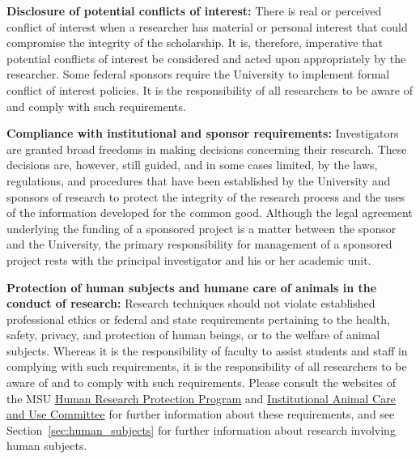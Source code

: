 \textbf{Disclosure of potential conflicts of interest:} There is real
or perceived conflict of interest when a researcher has material or
personal interest that could compromise the integrity of the
scholarship. It is, therefore, imperative that potential conflicts of
interest be considered and acted upon appropriately by the
researcher. Some federal sponsors require the University to implement
formal conflict of interest policies. It is the responsibility of all
researchers to be aware of and comply with such requirements. 

\textbf{Compliance with institutional and sponsor requirements:}
Investigators are granted broad freedoms in making decisions
concerning their research. These decisions are, however, still guided,
and in some cases limited, by the laws, regulations, and procedures
that have been established by the University and sponsors of research
to protect the integrity of the research process and the uses of the
information developed for the common good. Although the legal
agreement underlying the funding of a sponsored project is a matter
between the sponsor and the University, the primary responsibility for
management of a sponsored project rests with the principal
investigator and his or her academic unit. 

\textbf{Protection of human subjects and humane care of animals in the
  conduct of research:} Research techniques should not violate
established professional ethics or federal and state requirements
pertaining to the health, safety, privacy, and protection of human
beings, or to the welfare of animal subjects. Whereas it is the
responsibility of faculty to assist students and staff in complying
with such requirements, it is the responsibility of all researchers to
be aware of and to comply with such requirements.  Please consult the
websites of the MSU \href{https://hrpp.msu.edu/}{Human Research
  Protection Program} and
\href{http://animalcare.msu.edu/}{Institutional Animal Care and Use
  Committee} for further information about these requirements, and see
Section~\ref{sec:human_subjects} for further information about
research involving human subjects.

